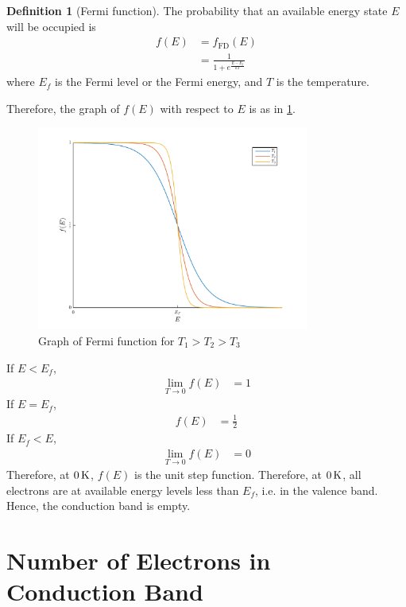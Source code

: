 \documentclass[titlepage, fleqn, a4paper, 12pt, twoside]{article}
\theoremstyle{definition}
\newtheorem{definition}{Definition}
\theoremstyle{theorem}
\begin{document}
\begin{definition}[Fermi function]
	The probability that an available energy state $E$ will be occupied is
	\begin{align*}
		f(E) & = f_{\text{FD}}(E) \\
                     & = \frac{1}{1 + e^{\frac{E - E_f}{k T}}}
	\end{align*}
	where $E_f$ is the Fermi level or the Fermi energy, and $T$ is the temperature.
\end{definition}
Therefore, the graph of $f(E)$ with respect to $E$ is as in \cref{fig:Graph_of_Fermi_function_for_$T_1_>_T_2_>_T_3$}.
\begin{figure}[h]
	\centering
	\includegraphics[width = 0.8\textwidth]{./Plots/fermi_function.pdf}
	\caption{Graph of Fermi function for $T_1 > T_2 > T_3$}
	\label{fig:Graph_of_Fermi_function_for_$T_1_>_T_2_>_T_3$}
\end{figure}
If $E < E_f$,
\begin{align*}
	\lim\limits_{T \to 0} f(E) & = 1
\end{align*}
If $E = E_f$,
\begin{align*}
	f(E) & = \frac{1}{2}
\end{align*}
If $E_f < E$,
\begin{align*}
	\lim\limits_{T \to 0} f(E) & = 0
\end{align*}
Therefore, at $0 \kelvin$, $f(E)$ is the unit step function.
Therefore, at $0 \kelvin$, all electrons are at available energy levels less than $E_f$, i.e. in the valence band.
Hence, the conduction band is empty.

\section{Number of Electrons in Conduction Band}
\end{document}
